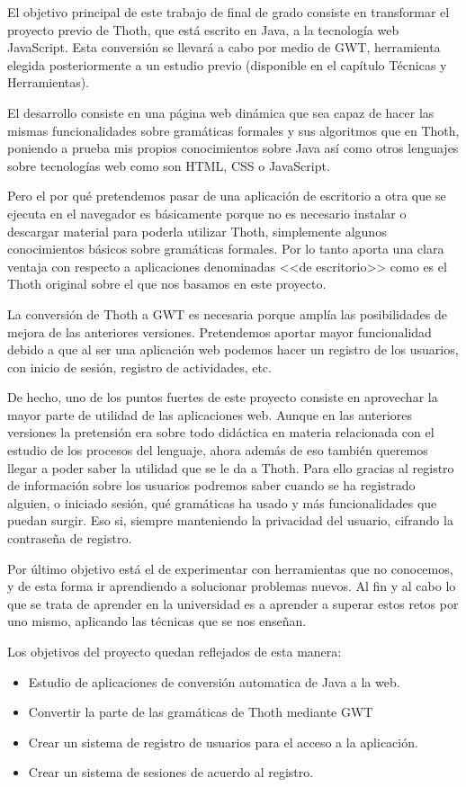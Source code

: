 
El objetivo principal de este trabajo de final de grado consiste en transformar el proyecto previo de Thoth, que está escrito en Java, a la tecnología web JavaScript. Esta conversión se llevará a cabo por medio de GWT, herramienta elegida posteriormente a un estudio previo (disponible en el capítulo Técnicas y Herramientas). 

El desarrollo consiste en una página web dinámica que sea capaz de hacer las mismas funcionalidades sobre gramáticas formales y sus algoritmos que en Thoth, poniendo a prueba mis propios conocimientos sobre Java así como otros lenguajes sobre tecnologías web como son HTML, CSS o JavaScript.

Pero el por qué pretendemos pasar de una aplicación de escritorio a otra que se ejecuta en el navegador es básicamente porque no es necesario instalar o descargar material para poderla utilizar Thoth, simplemente algunos conocimientos básicos sobre gramáticas formales. Por lo tanto aporta una clara ventaja con respecto a aplicaciones denominadas <<de escritorio>> como es el Thoth original sobre el que nos basamos en este proyecto.

La conversión de Thoth a GWT es necesaria porque amplía las posibilidades de mejora de las anteriores versiones. Pretendemos aportar mayor funcionalidad debido a que al ser una aplicación web podemos hacer un registro de los usuarios, con inicio de sesión, registro de actividades, etc. 

De hecho, uno de los puntos fuertes de este proyecto consiste en aprovechar la mayor parte de utilidad de las aplicaciones web. Aunque en las anteriores versiones la pretensión era sobre todo didáctica en materia relacionada con el estudio de los procesos del lenguaje, ahora además de eso también queremos llegar a poder saber la utilidad que se le da a Thoth. Para ello gracias al registro de información sobre los usuarios podremos saber cuando se ha registrado alguien, o iniciado sesión, qué gramáticas ha usado y más funcionalidades que puedan surgir. Eso si, siempre manteniendo la privacidad del usuario, cifrando la contraseña de registro.

Por último objetivo está el de experimentar con herramientas que no conocemos, y de esta forma ir aprendiendo a solucionar problemas nuevos. Al fin y al cabo lo que se trata de aprender en la universidad es a aprender a superar estos retos por uno mismo, aplicando las técnicas que se nos enseñan.

Los objetivos del proyecto quedan reflejados de esta manera:

\begin{itemize}

\item Estudio de aplicaciones de conversión automatica de Java a la web.
\item Convertir la parte de las gramáticas de Thoth mediante GWT
\item Crear un sistema de registro de usuarios para el acceso a la aplicación.
\item Crear un sistema de sesiones de acuerdo al registro.

\end{itemize}
